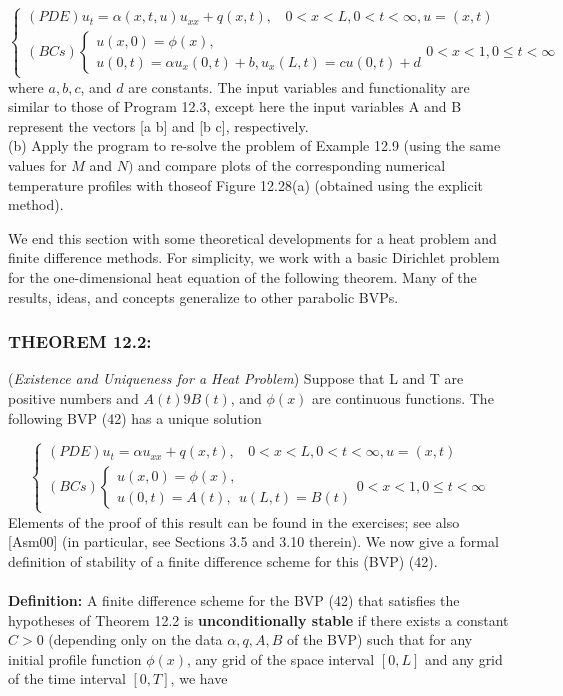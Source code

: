 \documentclass[../main.tex]{subfiles}
\begin{document}
$$\begin{cases} 
	(PDE) u_t=\alpha(x,t,u) u_{xx}+q(x,t),
	~~~~0<x<L, 0<t<\infty,u=(x,t)\\
(BCs)
		\begin{cases}
		u(x,0)=\phi(x),\\
		u(0,t)=\alpha u_x(0,t)+b, u_x(L,t) =cu(0,t)+d
		\end{cases}
		0 < x < 1, 0 \leqslant t < \infty 
	\end{cases}$$
where $a, b, c$, and $d$ are constants. The input variables and functionality are similar to those of Program 12.3, except here the input variables A and B represent the vectors [a b] and [b c], respectively.
\\
(b) Apply the program to re-solve the problem of Example 12.9 (using the same values for $M$ and $N)$ and compare plots of the corresponding numerical temperature profiles with thoseof Figure 12.28(a) (obtained using the explicit method).


We end this section with some theoretical developments for a heat problem and 
 finite difference methods. For simplicity, we work with a basic Dirichlet problem for the one-dimensional heat equation of the following theorem. Many of the results, ideas, and concepts generalize to other parabolic BVPs.

\subsubsection{THEOREM 12.2:}
(\textit{Existence and Uniqueness for a Heat Problem}) Suppose that L and T are positive numbers and $A(t)9 B(t)$, and $\phi(x)$ are continuous functions. The following BVP (42) has a unique solution 

$$\begin{cases} 
	(PDE) u_t=\alpha u_{xx}+q(x,t),
	~~~~0<x<L, 0<t<\infty,u=(x,t)\\
(BCs)
		\begin{cases}
		u(x,0)=\phi(x),\\
		u(0,t)=A(t),~~u(L,t) =B(t)
		\end{cases}
		0 < x < 1, 0 \leqslant t < \infty 
	\end{cases}$$
Elements of the proof of this result can be found in the exercises; see also [Asm00] (in particular, see Sections 3.5 and 3.10 therein). We now give a formal definition of stability of a finite difference scheme for this (BVP) (42).
\\
\\
\textbf{Definition:} A finite difference scheme for the BVP (42) that satisfies the hypotheses of Theorem 12.2 is \textbf{unconditionally stable} if there exists a constant $C > 0$ (depending only on the data $\alpha,q,A,B$ of the BVP) such that for any initial profile function $\phi(x)$, any grid of the space interval $[0, L]$ and any grid of the time interval $[0, T]$, we have
\end{document}
